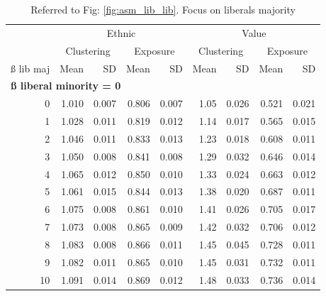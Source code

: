 \documentclass[
]{article}
\begin{document}
\begin{table}

\caption{\label{tab:asm_lib_majt_t}Referred to Fig: \ref{fig:asm_lib_lib}. Focus on liberals majority}
\centering
\fontsize{9}{11}\selectfont
\begin{tabular}[t]{r|r|r|r|r|r|r|r|r}
\hline
\multicolumn{1}{c|}{ } & \multicolumn{4}{c|}{Ethnic} & \multicolumn{4}{c}{Value} \\
\cline{2-5} \cline{6-9}
\multicolumn{1}{c|}{ } & \multicolumn{2}{c|}{Clustering} & \multicolumn{2}{c|}{Exposure} & \multicolumn{2}{c|}{Clustering} & \multicolumn{2}{c}{Exposure} \\
\cline{2-3} \cline{4-5} \cline{6-7} \cline{8-9}
ß lib maj & Mean & SD & Mean & SD & Mean & SD & Mean & SD\\
\hline
\multicolumn{9}{l}{\textbf{ß liberal minority = 0}}\\
\hline
\hspace{1em}0 & 1.010 & 0.007 & 0.806 & 0.007 & 1.05 & 0.026 & 0.521 & 0.021\\
\hline
\hspace{1em}1 & 1.028 & 0.011 & 0.819 & 0.012 & 1.14 & 0.017 & 0.565 & 0.015\\
\hline
\hspace{1em}2 & 1.046 & 0.011 & 0.833 & 0.013 & 1.23 & 0.018 & 0.608 & 0.011\\
\hline
\hspace{1em}3 & 1.050 & 0.008 & 0.841 & 0.008 & 1.29 & 0.032 & 0.646 & 0.014\\
\hline
\hspace{1em}4 & 1.065 & 0.012 & 0.850 & 0.010 & 1.33 & 0.024 & 0.663 & 0.012\\
\hline
\hspace{1em}5 & 1.061 & 0.015 & 0.844 & 0.013 & 1.38 & 0.020 & 0.687 & 0.011\\
\hline
\hspace{1em}6 & 1.075 & 0.008 & 0.861 & 0.010 & 1.41 & 0.026 & 0.705 & 0.017\\
\hline
\hspace{1em}7 & 1.073 & 0.008 & 0.865 & 0.009 & 1.42 & 0.032 & 0.706 & 0.012\\
\hline
\hspace{1em}8 & 1.083 & 0.008 & 0.866 & 0.011 & 1.45 & 0.045 & 0.728 & 0.011\\
\hline
\hspace{1em}9 & 1.082 & 0.011 & 0.865 & 0.010 & 1.45 & 0.031 & 0.732 & 0.011\\
\hline
\hspace{1em}10 & 1.091 & 0.014 & 0.869 & 0.012 & 1.48 & 0.033 & 0.736 & 0.014\\

\end{tabular}
\end{table}
\end{document}
